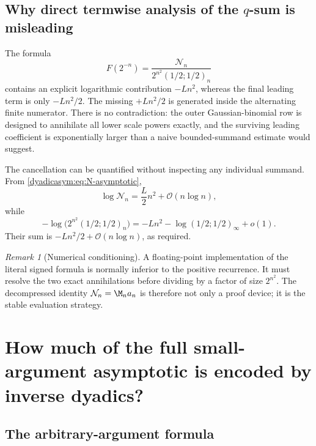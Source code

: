 \documentclass[11pt,oneside]{article}
\theoremstyle{definition}
\theoremstyle{remark}
\newtheorem{remark}[remark]{Remark}
\newcommand{\bigO}{\mathcal O}
\newcommand{\smallo}{o}
\begin{document}
\subsection{Why direct termwise analysis of the \texorpdfstring{$q$}{q}-sum is misleading}

The formula
\begin{equation*}
 F(2^{-n})=\frac{\mathcal N_n}{2^{n^2}(1/2;1/2)_n}
\end{equation*}
contains an explicit logarithmic contribution $-Ln^2$, whereas the final leading term is only
$-Ln^2/2$.  The missing $+Ln^2/2$ is generated inside the alternating finite numerator.
There is no contradiction: the outer Gaussian-binomial row is designed to annihilate all
lower scale powers exactly, and the surviving leading coefficient is exponentially larger
than a naive bounded-summand estimate would suggest.

The cancellation can be quantified without inspecting any individual summand.  From
\eqref{dyadicasym:eq:N-asymptotic},
\begin{equation}
 \log\mathcal N_n=\frac L2n^2+\bigO(n\log n),               \label{dyadicasym:eq:N-leading}
\end{equation}
while
\begin{equation}
 -\log\bigl(2^{n^2}(1/2;1/2)_n\bigr)
 =-Ln^2-\log(1/2;1/2)_\infty+\smallo(1).                   \label{dyadicasym:eq:q-den-leading}
\end{equation}
Their sum is $-Ln^2/2+\bigO(n\log n)$, as required.

\begin{remark}[Numerical conditioning]
A floating-point implementation of the literal signed formula is normally inferior to the
positive recurrence.  It must resolve the two exact annihilations before dividing by a factor
of size $2^{n^2}$.  The decompressed identity $\mathcal N_n=\M_na_n$ is therefore not only a
proof device; it is the stable evaluation strategy.
\end{remark}

\section{How much of the full small-argument asymptotic is encoded by inverse dyadics?}
\label{dyadicasym:sec:general-x}

\subsection{The arbitrary-argument formula}
\end{document}
